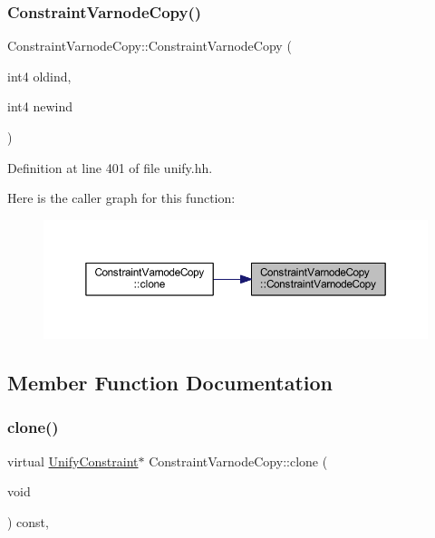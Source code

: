 \subsubsection{\texorpdfstring{ConstraintVarnodeCopy()}{ConstraintVarnodeCopy()}}
{\footnotesize\ttfamily Constraint\+Varnode\+Copy\+::\+Constraint\+Varnode\+Copy (\begin{DoxyParamCaption}\item[{int4}]{oldind,  }\item[{int4}]{newind }\end{DoxyParamCaption})\hspace{0.3cm}{\ttfamily [inline]}}



Definition at line 401 of file unify.\+hh.

Here is the caller graph for this function\+:
\nopagebreak
\begin{figure}[H]
\begin{center}
\leavevmode
\includegraphics[width=350pt]{class_constraint_varnode_copy_a00b3daf6c1e160b51a58c2c51028705b_icgraph}
\end{center}
\end{figure}


\subsection{Member Function Documentation}
\mbox{\label{class_constraint_varnode_copy_a8334114ed67c5c1e1d7655d9b69bb603}} 
\subsubsection{\texorpdfstring{clone()}{clone()}}
{\footnotesize\ttfamily virtual \mbox{\hyperlink{class_unify_constraint}{Unify\+Constraint}}$\ast$ Constraint\+Varnode\+Copy\+::clone (\begin{DoxyParamCaption}\item[{void}]{ }\end{DoxyParamCaption}) const\hspace{0.3cm}{\ttfamily [inline]}, {\ttfamily [virtual]}}



